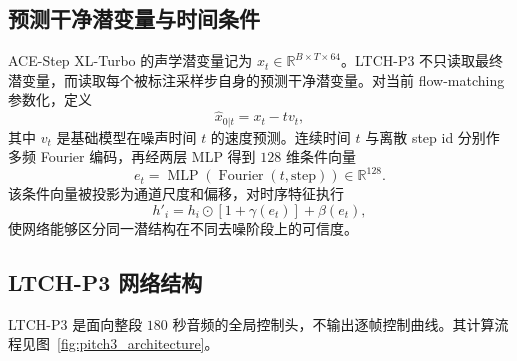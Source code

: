 \documentclass{article}
\begin{document}
\subsection{预测干净潜变量与时间条件}

ACE-Step XL-Turbo 的声学潜变量记为 $x_t\in\mathbb R^{B\times T\times64}$。LTCH-P3 不只读取最终潜变量，而读取每个被标注采样步自身的预测干净潜变量。对当前 flow-matching 参数化，定义
\begin{equation}
\hat{x}_{0|t}=x_t-t v_t,
\label{eq:pred_clean_latent}
\end{equation}
其中 $v_t$ 是基础模型在噪声时间 $t$ 的速度预测。连续时间 $t$ 与离散 step id 分别作多频 Fourier 编码，再经两层 MLP 得到 $128$ 维条件向量
\begin{equation}
e_t=\operatorname{MLP}(\operatorname{Fourier}(t,\mathrm{step}))
\in\mathbb R^{128}.
\end{equation}
该条件向量被投影为通道尺度和偏移，对时序特征执行
\begin{equation}
h'_i=h_i\odot[1+\gamma(e_t)]+\beta(e_t),
\end{equation}
使网络能够区分同一潜结构在不同去噪阶段上的可信度。

\subsection{LTCH-P3 网络结构}

LTCH-P3 是面向整段 $180$ 秒音频的全局控制头，不输出逐帧控制曲线。其计算流程见图~\ref{fig:pitch3_architecture}。
\end{document}
